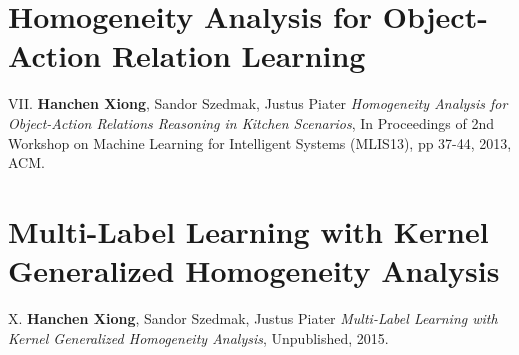 \section{Homogeneity Analysis for Object-Action Relation Learning}
\begin{shaded}
{\Huge VII.} \textbf{Hanchen Xiong}, Sandor Szedmak, Justus Piater {\it Homogeneity Analysis for Object-Action Relations Reasoning in Kitchen Scenarios}, 
In Proceedings of 2nd Workshop on Machine Learning for Intelligent Systems (MLIS13), pp 37-44,  2013, ACM. 
\vspace{-.2cm}
\end{shaded}




\section{Multi-Label Learning with Kernel Generalized Homogeneity Analysis}
\begin{shaded}
 {\Huge X.} \textbf{Hanchen Xiong}, Sandor Szedmak, Justus Piater {\it Multi-Label Learning with Kernel Generalized Homogeneity Analysis}, 
Unpublished, 2015.
\end{shaded}



